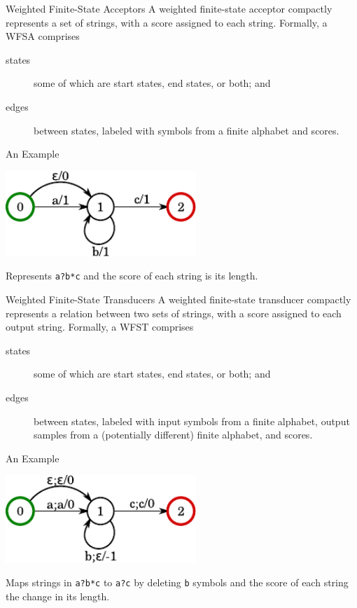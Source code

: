 \begin{frame}{Weighted Finite-State Acceptors}{}
  A \alert{weighted finite-state acceptor} compactly represents a set
  of strings, with a score assigned to each string.
  \vfill
  Formally, a WFSA comprises
  \begin{description}
  \item[states] some of which are start states, end states, or both;
    and
  \item[edges] between states, labeled with symbols from a finite
    alphabet and scores.
  \end{description}
\end{frame}

\begin{frame}{An Example}{}
  \begin{center}
    \includegraphics[width=72mm]{figures/WFSA}
  \end{center}
  \vfill
  Represents {\tt a?b*c} and the score of each string is its length.
\end{frame}

\begin{frame}{Weighted Finite-State Transducers}{}
  A \alert{weighted finite-state transducer} compactly represents a
  relation between two sets of strings, with a score assigned to each
  output string.
  \vfill
  Formally, a WFST comprises
  \begin{description}
  \item[states] some of which are start states, end states, or both;
    and
  \item[edges] between states, labeled with input symbols from a
    finite alphabet, output samples from a (potentially different)
    finite alphabet, and scores.
  \end{description}
\end{frame}

\begin{frame}{An Example}{}
  \begin{center}
    \includegraphics[width=72mm]{figures/WFST}
  \end{center}
  \vfill
  Maps strings in {\tt a?b*c} to {\tt a?c} by deleting {\tt b} symbols
  and the score of each string the change in its length.
\end{frame}

